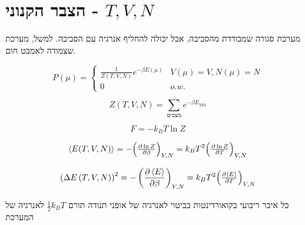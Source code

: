 \section{הצבר הקנוני - $T,V,N$}
מערכת סגורה שמבודדת מהסביבה, אבל יכולה להחליף אנרגיה עם הסביבה.
למשל, מערכת שצמודה לאמבט חום.
\begin{cheatformula}
$$
 P \left(\mu\right) = \begin{cases}
     \frac{1}{Z \left( T,V,N \right)} e^{-\beta E\left(\mu\right)} &  V\left(\mu\right)=V,N\left(\mu\right)=N\\
     0 & o.w.
 \end{cases}
 $$\end{cheatformula}
\begin{cheatformula}
$$Z\left(T,V,N\right) = \sum_\text{מצבים} e^{-\beta E_\text{מצב}}$$
\end{cheatformula}
\begin{cheatformula}
$$F=-k_BT\ln{Z}$$    
\end{cheatformula}

\begin{cheatformula}
\begin{align*}
    \left< E(T,V,N) \right> = - \Bigl(\tfrac{\partial \ln{Z}}{\partial \beta}\Bigr)_{V,N} = 
    k_B T^2 \Bigl(\tfrac{\partial \ln{Z}}{\partial T}\Bigr)_{V,N}
\end{align*}

\begin{cheatformula}
\begin{align*}
    \left( \Delta E \left(T,V,N\right) \right)^2 = - \left( \frac{\partial \left< E \right>}{\partial \beta}\right)_{V,N} =
    k_B T^2 \Bigl(\tfrac{\partial \left< E \right>}{\partial T}\Bigr)_{V,N}
\end{align*}
\end{cheatformula}

\begin{cheatformula}
    כל איבר ריבועי בקואורדינטות בביטוי לאנרגיה של אופני תנודה תורם $\frac{1}{2}k_BT$ לאנרגיה של המערכת
\end{cheatformula}

\end{cheatformula}

